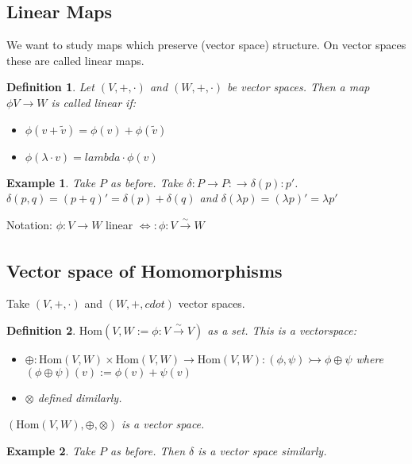 \documentclass[10pt, oneside]{article}
\newtheorem{defn}{Definition}
\newtheorem{example}{Example}
\begin{document}
      \subsection*{Linear Maps}
         We want to study maps which preserve (vector space) structure. On vector spaces these are called linear maps.
         \begin{defn}
            Let $(V,+,\cdot)$ and $(W,+,\cdot)$ be vector spaces. Then a map $\phi V \to W$ is called linear if:
            \begin{itemize}
               \item $\phi(v+\tilde{v}) = \phi(v) + \phi(\tilde{v})$
               \item $\phi(\lambda \cdot v) = lambda \cdot \phi(v)$
            \end{itemize}
         \end{defn}
         \begin{example}
            Take $P$ as before. Take $\delta: P \to P: \rightarrow \delta(p):p'$. $\delta(p,q) = (p+q)'=\delta(p)+\delta(q)$ and $\delta(\lambda p) = (\lambda p)' = \lambda p'$
         \end{example}
            Notation: $\phi: V \to W$ linear $\iff: \phi:V \xrightarrow[]{\sim} W$
      \subsection*{Vector space of Homomorphisms}
         Take $(V,+,\cdot)$ and $(W,+,cdot)$ vector spaces.
         \begin{defn}
            $\text{Hom}(V,W:={\phi: V \xrightarrow{\sim} V})$ as a set. This is a vectorspace: 
            \begin{itemize}
               \item $\oplus: \text{Hom}(V,W) \times \text{Hom}(V,W) \to \text{Hom}(V,W): (\phi,\psi) \rightarrowtail \phi \oplus \psi$ where $(\phi \oplus \psi)(v) := \phi(v) + \psi(v)$
               \item $\otimes$ defined dimilarly. 
            \end{itemize}
            $(\text{Hom}(V,W),\oplus,\otimes)$ is a vector space. 
         \end{defn}
         \begin{example}
            Take $P$ as before. Then $\delta$ is a vector space similarly. 
         \end{example}
\end{document}
